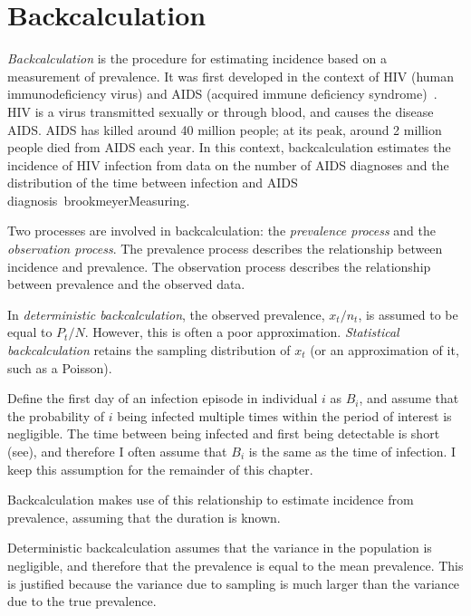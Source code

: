 \documentclass[thesis.tex]{subfiles}
\begin{document}
\section{Backcalculation}

\emph{Backcalculation} is the procedure for estimating incidence based on a measurement of prevalence.
It was first developed in the context of HIV (human immunodeficiency virus) and AIDS (acquired immune deficiency syndrome)~\autocite{brookmeyerMethod}.
HIV is a virus transmitted sexually or through blood, and causes the disease AIDS.
AIDS has killed around 40 million people; at its peak, around 2 million people died from AIDS each year.
In this context, backcalculation estimates the incidence of HIV infection from data on the number of AIDS diagnoses and the distribution of the time between infection and AIDS diagnosis~\autocite{brookmeyerBackcalculation}{brookmeyerMeasuring}.

Two processes are involved in backcalculation: the \emph{prevalence process} and the \emph{observation process}.
The prevalence process describes the relationship between incidence and prevalence.
The observation process describes the relationship between prevalence and the observed data.

In \emph{deterministic backcalculation}, the observed prevalence, $x_t/n_t$, is assumed to be equal to $P_t/N$.
However, this is often a poor approximation.
\emph{Statistical backcalculation} retains the sampling distribution of $x_t$ (or an approximation of it, such as a Poisson).

Define the first day of an infection episode in individual $i$ as $B_i$, and assume that the probability of $i$ being infected multiple times within the period of interest is negligible.
The time between being infected and first being detectable is short (see), and therefore I often assume that $B_i$ is the same as the time of infection.
I keep this assumption for the remainder of this chapter.


Backcalculation makes use of this relationship to estimate incidence from prevalence, assuming that the duration is known.

Deterministic backcalculation assumes that the variance in the population is negligible, and therefore that the prevalence is equal to the mean prevalence.
This is justified because the variance due to sampling is much larger than the variance due to the true prevalence.
\end{document}
